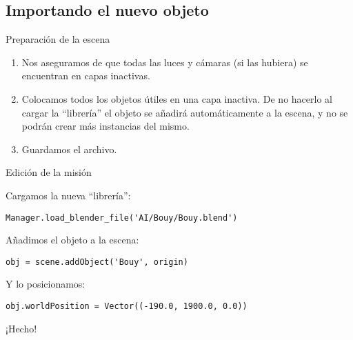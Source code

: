 \subsection{Importando el nuevo objeto}

\begin{frame}{Preparación de la escena}

\begin{enumerate}
	\item Nos aseguramos de que todas las luces y cámaras (si las hubiera) se
	encuentran en capas inactivas.
	\item Colocamos todos los objetos útiles en una capa inactiva. De no hacerlo
	al cargar la ``librería'' el objeto se añadirá automáticamente a la escena,
	y no se podrán crear más instancias del mismo.
	\item Guardamos el archivo.
\end{enumerate}

\end{frame}

\begin{frame}[fragile]{Edición de la misión}

Cargamos la nueva ``librería'':
\begin{verbatim}
Manager.load_blender_file('AI/Bouy/Bouy.blend')
\end{verbatim}

Añadimos el objeto a la escena:
\begin{verbatim}
obj = scene.addObject('Bouy', origin)
\end{verbatim}

Y lo posicionamos:
\begin{verbatim}
obj.worldPosition = Vector((-190.0, 1900.0, 0.0))
\end{verbatim}

\begin{center}
{\Huge ¡Hecho!}
\end{center}

\end{frame}

